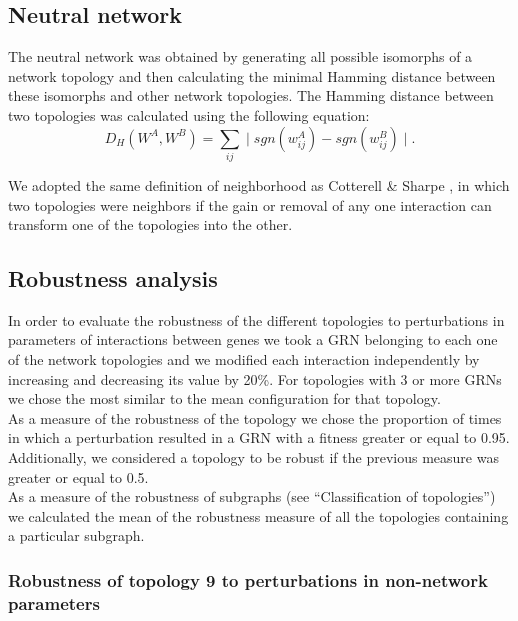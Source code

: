 \documentclass[10pt,letterpaper]{article}
\begin{document}
\subsection*{Neutral network}

The neutral network was obtained by generating all possible isomorphs of a
network topology and then calculating the minimal Hamming distance between these
isomorphs and other network topologies. The Hamming distance between two
topologies was calculated using the following equation:
\begin{equation}
 D_H(W^A, W^B) = \sum_{ij} \mid sgn(w_{ij}^A) - sgn(w^B_{ij}) \mid .
\end{equation}

We adopted the same definition of neighborhood as Cotterell \& Sharpe
\cite{Cotterell2010}, in which two topologies were neighbors if the gain or
removal of any one interaction can transform one of the topologies into the
other.

\subsection*{Robustness analysis}

In order to evaluate the robustness of the different topologies to perturbations
in parameters of interactions between genes we took a GRN belonging to each one
of the network topologies and we modified each interaction independently by
increasing and decreasing its value by 20\%. For topologies with 3 or more
GRNs we chose the most similar to the mean configuration for that topology.\\

As a measure of the robustness of the topology we chose the proportion of times
in which a perturbation resulted in a GRN with a fitness greater or equal to
0.95. Additionally, we considered a topology to be robust if the previous
measure was greater or equal to 0.5.\\

As a measure of the robustness of subgraphs (see “Classification of topologies”)
we calculated the mean of the robustness measure of all the topologies
containing a particular subgraph.\\

\subsubsection*{Robustness of topology 9 to perturbations in non-network parameters}
\end{document}

